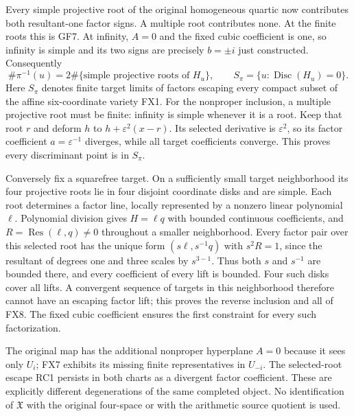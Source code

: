 Every simple projective root of the original homogeneous quartic
now contributes both resultant-one factor signs. A multiple root
contributes none. At the finite roots this is GF7. At infinity,
$A=0$ and the fixed cubic coefficient is one, so infinity is
simple and its two signs are precisely $b=\pm i$ just constructed.
Consequently
\[
 \#\pi^{-1}(u)=2\#\{\text{simple projective roots of }H_u\},
 \qquad S_\pi=\{u:\operatorname{Disc}(H_u)=0\}.
 \tag{FX8}
\]
Here $S_\pi$ denotes finite target limits of factors escaping every
compact subset of the affine six-coordinate variety FX1.
For the nonproper inclusion, a multiple projective root must be
finite: infinity is simple whenever it is a root. Keep that root
$r$ and deform $h$ to $h+\varepsilon^2(x-r)$. Its selected
derivative is $\varepsilon^2$, so its factor coefficient
$a=\varepsilon^{-1}$ diverges, while all target coefficients
converge. This proves every discriminant point is in $S_\pi$.

Conversely fix a squarefree target. On a sufficiently small target
neighborhood its four projective roots lie in four disjoint coordinate
disks and are simple. Each root determines a factor line, locally
represented by a nonzero linear polynomial $\ell$. Polynomial
division gives $H=\ell q$ with bounded continuous coefficients,
and $R=\operatorname{Res}(\ell,q)\ne0$ throughout a smaller
neighborhood. Every factor pair over this selected root has the
unique form $(s\ell,s^{-1}q)$ with $s^2R=1$, since the
resultant of degrees one and three scales by $s^{3-1}$.
Thus both $s$ and $s^{-1}$ are bounded there, and every coefficient
of every lift is bounded. Four such disks cover all lifts. A
convergent sequence of targets in this neighborhood therefore
cannot have an escaping factor lift; this proves the reverse
inclusion and all of FX8. The fixed cubic coefficient ensures
the first constraint for every such factorization.

The original map has the additional nonproper hyperplane $A=0$
because it sees only $U_i$; FX7 exhibits its missing finite
representatives in $U_{-i}$. The selected-root escape RC1 persists
in both charts as a divergent factor coefficient. These are
explicitly different degenerations of the same completed object.
No identification of $\mathfrak X$ with the original four-space
or with the arithmetic source quotient is used.

